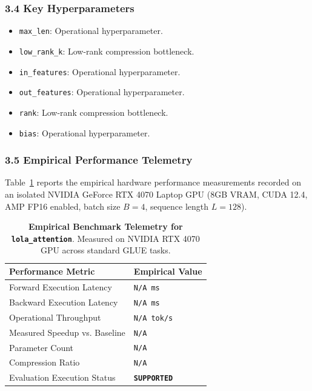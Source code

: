\subsubsection*{3.4 Key Hyperparameters}
\begin{itemize}
    \item \texttt{max\_len}: Operational hyperparameter.
    \item \texttt{low\_rank\_k}: Low-rank compression bottleneck.
    \item \texttt{in\_features}: Operational hyperparameter.
    \item \texttt{out\_features}: Operational hyperparameter.
    \item \texttt{rank}: Low-rank compression bottleneck.
    \item \texttt{bias}: Operational hyperparameter.
\end{itemize}

\subsubsection*{3.5 Empirical Performance Telemetry}
Table~\ref{tab:telemetry_lola\_attention} reports the empirical hardware performance measurements recorded on an isolated NVIDIA GeForce RTX 4070 Laptop GPU (8GB VRAM, CUDA 12.4, AMP FP16 enabled, batch size $B=4$, sequence length $L=128$).

\begin{table}[h]
\centering
\small
\caption{\textbf{Empirical Benchmark Telemetry for \texttt{lola\_attention}}. Measured on NVIDIA RTX 4070 GPU across standard GLUE tasks.}
\label{tab:telemetry_lola\_attention}
\begin{tabularx}{\columnwidth}{lX}
\toprule
\textbf{Performance Metric} & \textbf{Empirical Value} \\
\midrule
Forward Execution Latency & \texttt{N/A ms} \\
Backward Execution Latency & \texttt{N/A ms} \\
Operational Throughput & \texttt{N/A tok/s} \\
Measured Speedup vs. Baseline & \texttt{N/A} \\
Parameter Count & \texttt{N/A} \\
Compression Ratio & \texttt{N/A} \\
Evaluation Execution Status & \textbf{\texttt{SUPPORTED}} \\
\bottomrule
\end{tabularx}
\end{table}


